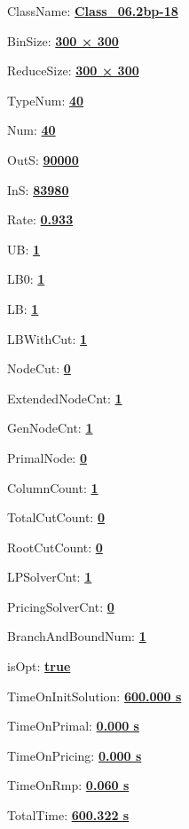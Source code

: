 \documentclass[11pt]{article}
\begin{document}
\pagestyle{empty}


ClassName: \underline{\textbf{Class_06.2bp-18}}
\par
BinSize: \underline{\textbf{300 × 300}}
\par
ReduceSize: \underline{\textbf{300 × 300}}
\par
TypeNum: \underline{\textbf{40}}
\par
Num: \underline{\textbf{40}}
\par
OutS: \underline{\textbf{90000}}
\par
InS: \underline{\textbf{83980}}
\par
Rate: \underline{\textbf{0.933}}
\par
UB: \underline{\textbf{1}}
\par
LB0: \underline{\textbf{1}}
\par
LB: \underline{\textbf{1}}
\par
LBWithCut: \underline{\textbf{1}}
\par
NodeCut: \underline{\textbf{0}}
\par
ExtendedNodeCnt: \underline{\textbf{1}}
\par
GenNodeCnt: \underline{\textbf{1}}
\par
PrimalNode: \underline{\textbf{0}}
\par
ColumnCount: \underline{\textbf{1}}
\par
TotalCutCount: \underline{\textbf{0}}
\par
RootCutCount: \underline{\textbf{0}}
\par
LPSolverCnt: \underline{\textbf{1}}
\par
PricingSolverCnt: \underline{\textbf{0}}
\par
BranchAndBoundNum: \underline{\textbf{1}}
\par
isOpt: \underline{\textbf{true}}
\par
TimeOnInitSolution: \underline{\textbf{600.000 s}}
\par
TimeOnPrimal: \underline{\textbf{0.000 s}}
\par
TimeOnPricing: \underline{\textbf{0.000 s}}
\par
TimeOnRmp: \underline{\textbf{0.060 s}}
\par
TotalTime: \underline{\textbf{600.322 s}}
\par
\newpage
\end{document}
